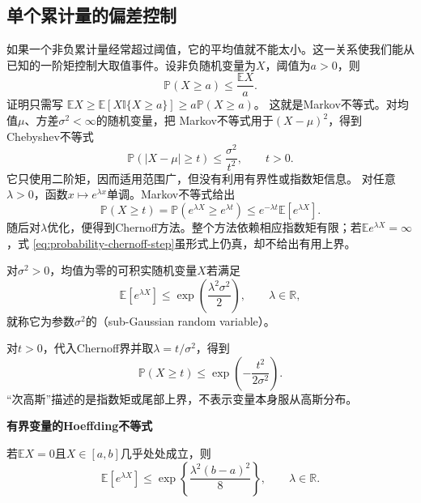 \subsection{单个累计量的偏差控制}
\label{sec:probability-basic-tail-bounds}
\label{sec:probability-concentration-inequalities}

如果一个非负累计量经常超过阈值，它的平均值就不能太小。这一关系使我们能从已知的一阶矩控制大取值事件。设非负随机变量为\(X\)，阈值为\(a>0\)，则
\begin{equation}
  \mathbb{P}(X\geq a)
  \leq
  \frac{\mathbb{E}X}{a}.
  \label{eq:probability-markov-inequality}
\end{equation}
证明只需写
\(\mathbb{E}X\geq
\mathbb{E}[X\mathbb{I}\{X\geq a\}]
\geq a\mathbb{P}(X\geq a)\)。
这就是Markov不等式。对均值\(\mu\)、方差\(\sigma^2<\infty\)的随机变量，把
Markov不等式用于\((X-\mu)^2\)，得到Chebyshev不等式
\begin{equation}
  \mathbb{P}(|X-\mu|\geq t)
  \leq\frac{\sigma^2}{t^2},
  \qquad t>0.
  \label{eq:probability-chebyshev-inequality}
\end{equation}
它只使用二阶矩，因而适用范围广，但没有利用有界性或指数矩信息。
对任意\(\lambda>0\)，函数\(x\mapsto e^{\lambda x}\)单调。Markov不等式给出
\begin{equation}
  \mathbb{P}(X\geq t)
  =
  \mathbb{P}(e^{\lambda X}\geq e^{\lambda t})
  \leq
  e^{-\lambda t}\mathbb{E}[e^{\lambda X}].
  \label{eq:probability-chernoff-step}
\end{equation}
随后对\(\lambda\)优化，便得到Chernoff方法。整个方法依赖相应指数矩有限；若\(\mathbb{E}e^{\lambda X}=\infty\)，式
\eqref{eq:probability-chernoff-step}虽形式上仍真，却不给出有用上界。

\begin{definition}[次高斯变量]
  \label{def:probability-subgaussian}
对\(\sigma^2>0\)，均值为零的可积实随机变量\(X\)若满足
\[ \mathbb{E}[e^{\lambda X}]
  \leq\exp\left(\frac{\lambda^2\sigma^2}{2}\right),\qquad \lambda\in\mathbb{R}, \]
就称它为参数\(\sigma^2\)的（sub-Gaussian random variable）。
\end{definition}
对\(t>0\)，代入Chernoff界并取\(\lambda=t/\sigma^2\)，得到
\[ \mathbb{P}(X\geq t)
  \leq\exp\left(-\frac{t^2}{2\sigma^2}\right). \]
“次高斯”描述的是指数矩或尾部上界，不表示变量本身服从高斯分布。

\par\medskip\noindent\textbf{有界变量的Hoeffding不等式}\quad
\begin{lemma}[Hoeffding引理]
\label{lem:probability-hoeffding-lemma}
若\(\mathbb{E}X=0\)且\(X\in[a,b]\)几乎处处成立，则
\[ \mathbb{E}[e^{\lambda X}]
  \leq\exp\left\{\frac{\lambda^2(b-a)^2}{8}\right\},\qquad \lambda\in\mathbb{R}. \]
\end{lemma}

